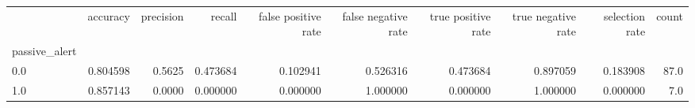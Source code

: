 \begin{tabular}{lrrrrrrrrr}
\toprule
{} &  accuracy &  precision &    recall &  false positive rate &  false negative rate &  true positive rate &  true negative rate &  selection rate &  count \\
passive\_alert &           &            &           &                      &                      &                     &                     &                 &        \\
\midrule
0.0           &  0.804598 &     0.5625 &  0.473684 &             0.102941 &             0.526316 &            0.473684 &            0.897059 &        0.183908 &   87.0 \\
1.0           &  0.857143 &     0.0000 &  0.000000 &             0.000000 &             1.000000 &            0.000000 &            1.000000 &        0.000000 &    7.0 \\
\bottomrule
\end{tabular}
